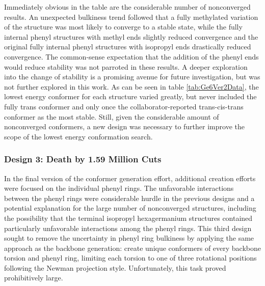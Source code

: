 Immediately obvious in the table are the considerable number of nonconverged results. 
An unexpected bulkiness trend followed that a fully methylated variation of the structure was most likely to converge to a stable state, while the fully internal phenyl structures with methyl ends slightly reduced convergence and the original fully internal phenyl structures with isopropyl ends drastically reduced convergence.
The common-sense expectation that the addition of the phenyl ends would reduce stability was not parroted in these results. 
A deeper exploration into the change of stability is a promising avenue for future investigation, but was not further explored in this work.
As can be seen in table \ref{tab:Ge6Ver2Data}, the lowest energy conformer for each structure varied greatly, but never included the fully trans conformer and only once the collaborator-reported trans-cis-trans conformer as the most stable.
Still, given the considerable amount of nonconverged conformers, a new design was necessary to further improve the scope of the lowest energy conformation search.

\subsubsection{Design 3: Death by 1.59 Million Cuts}

In the final version of the conformer generation effort, additional creation efforts were focused on the individual phenyl rings. 
The unfavorable interactions between the phenyl rings were considerable hurdle in the previous designs and a potential explanation for the large number of nonconverged structures, including the possibility that the terminal isopropyl hexagermanium structures contained particularly unfavorable interactions among the phenyl rings.
This third design sought to remove the uncertainty in phenyl ring bulkiness by applying the same approach as the backbone generation: create unique conformers of every backbone torsion and phenyl ring, limiting each torsion to one of three rotational positions following the Newman projection style. 
Unfortunately, this task proved prohibitively large.

